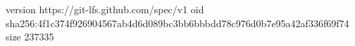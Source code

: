version https://git-lfs.github.com/spec/v1
oid sha256:4f1c374f926904567ab4d6d089bc3bb6bbbdd78c976d0b7e95a42af336f69f74
size 237335
